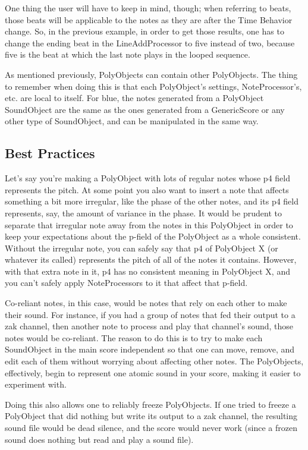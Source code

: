 One thing the user will have to keep in mind, though; when referring to
beats, those beats will be applicable to the notes as they are after the
Time Behavior change. So, in the previous example, in order to get those
results, one has to change the ending beat in the LineAddProcessor to
five instead of two, because five is the beat at which the last note
plays in the looped sequence.

As mentioned previously, PolyObjects can contain other PolyObjects. The
thing to remember when doing this is that each PolyObject's settings,
NoteProcessor's, etc. are local to itself. For blue, the notes generated
from a PolyObject SoundObject are the same as the ones generated from a
GenericScore or any other type of SoundObject, and can be manipulated in
the same way.

\subsection{Best Practices}

Let's say you're making a PolyObject with lots of regular notes whose p4
field represents the pitch. At some point you also want to insert a note
that affects something a bit more irregular, like the phase of the other
notes, and its p4 field represents, say, the amount of variance in the
phase. It would be prudent to separate that irregular note away from the
notes in this PolyObject in order to keep your expectations about the
p-field of the PolyObject as a whole consistent. Without the irregular
note, you can safely say that p4 of PolyObject X (or whatever its
called) represents the pitch of all of the notes it contains. However,
with that extra note in it, p4 has no consistent meaning in PolyObject
X, and you can't safely apply NoteProcessors to it that affect that
p-field.

Co-reliant notes, in this case, would be notes that rely on each other
to make their sound. For instance, if you had a group of notes that fed
their output to a zak channel, then another note to process and play
that channel's sound, those notes would be co-reliant. The reason to do
this is to try to make each SoundObject in the main score independent so
that one can move, remove, and edit each of them without worrying about
affecting other notes. The PolyObjects, effectively, begin to represent
one atomic sound in your score, making it easier to experiment with.

Doing this also allows one to reliably freeze PolyObjects. If one tried
to freeze a PolyObject that did nothing but write its output to a zak
channel, the resulting sound file would be dead silence, and the score
would never work (since a frozen sound does nothing but read and play a
sound file).

